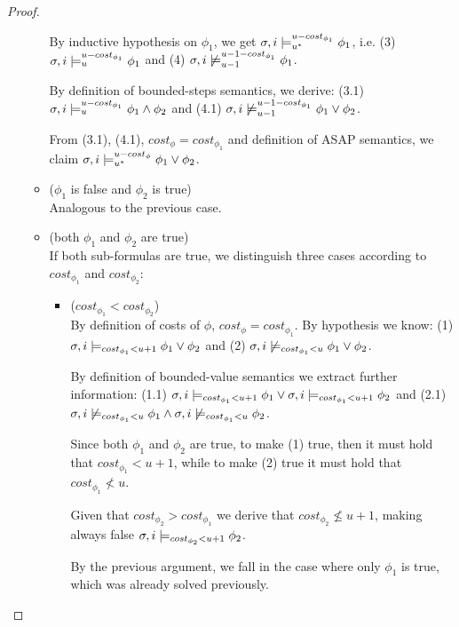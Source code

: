\begin{theorem}
\begin{proof}
\begin{itemize}
\begin{itemize}
        By inductive hypothesis on $\phi_1$, we get $\sigma,i \models_{{u}^*}^{u-cost_{\phi_1}} \phi_1$, i.e. (3) $\sigma,i \models_{u}^{u-cost_{\phi_1}} \phi_1$ and (4) $\sigma,i \not\models_{u-1}^{u-1-cost_{\phi_1}} \phi_1$.

        By definition of bounded-steps semantics, we derive:
        (3.1) $\sigma,i \models_{u}^{u-cost_{\phi_1}} \phi_1 \land \phi_2$ and
        (4.1) $\sigma,i \not\models_{u-1}^{u-1-cost_{\phi_1}} \phi_1 \lor \phi_2$.
        
        From (3.1), (4.1), $cost_\phi = cost_{\phi_1}$ and definition of ASAP semantics, we claim $\sigma,i \models_{{u}^*}^{u-cost_\phi} \phi_1 \lor \phi_2$.

        \item ($\phi_1$ is false and $\phi_2$ is true) \\
        Analogous to the previous case.

        \item (both $\phi_1$ and $\phi_2$ are true) \\
        If both sub-formulas are true, we distinguish three cases according to $cost_{\phi_1}$ and $cost_{\phi_2}$:
        \begin{itemize}
            \item ($cost_{\phi_1} < cost_{\phi_2}$) \\
            By definition of costs of $\phi$, $cost_\phi = cost_{\phi_1}$.
            By hypothesis we know: 
            (1) $\sigma,i \models_{cost_{\phi_1} < u+1} \phi_1 \lor \phi_2$ and 
            (2) $\sigma,i \not\models_{cost_{\phi_1} < u} \phi_1 \lor \phi_2$.
            
            By definition of bounded-value semantics we extract further information: 
            (1.1) $\sigma,i \models_{cost_{\phi_1} < u + 1} \phi_1 \lor \sigma,i \models_{cost_{\phi_1} < u+1} \phi_2$ and 
            (2.1) $\sigma,i \not\models_{cost_{\phi_1} < u} \phi_1 \land \sigma,i \not\models_{cost_{\phi_1} < u} \phi_2$.

            Since both $\phi_1$ and $\phi_2$ are true, to make (1) true, then it must hold that $cost_{\phi_1} < u+1$, while to make (2) true it must hold that  $cost_{\phi_1} \not< u$.

            Given that $cost_{\phi_2} > cost_{\phi_1}$ we derive that $cost_{\phi_2} \not\leq u+1$, making always false $\sigma,i \models_{cost_{\phi_2} < u + 1} \phi_2$.

            By the previous argument, we fall in the case where only $\phi_1$ is true, which was already solved previously. 


\end{itemize}
\end{itemize}
\end{itemize}
\end{proof}
\end{theorem}
